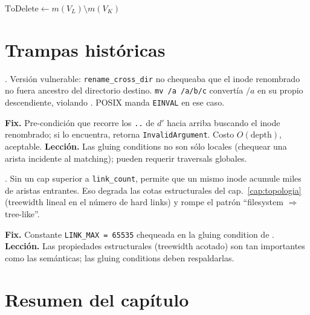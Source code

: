 \begin{algorithm}[H]
\SetAlgoLined
{}
\caption{\textsc{CheckGluing}}
\label{alg:check-gluing}

$\mathrm{ToDelete} \gets m(V_L) \setminus m(V_K)$\;
\;
\end{algorithm}

\section{Trampas históricas}

\begin{trampa}
\label{tr:rename-cycle}
. Versión vulnerable: \texttt{rename\_cross\_dir}
no chequeaba que el inode renombrado no fuera ancestro del directorio
destino. \texttt{mv /a /a/b/c} convertía $/a$ en su propio
descendiente, violando . POSIX manda
\texttt{EINVAL} en ese caso.

\textbf{Fix.} Pre-condición que recorre los \texttt{..} de $d'$ hacia
arriba buscando el inode renombrado; si lo encuentra, retorna
\texttt{InvalidArgument}. Costo $O(\mathrm{depth})$, aceptable.
\textbf{Lección.} Las gluing conditions no son sólo locales (chequear
una arista incidente al matching); pueden requerir traversals globales.
\end{trampa}

\begin{trampa}
\label{tr:link-treewidth}
. Sin un cap superior a \texttt{link\_count},
\oplink{} permite que un mismo inode acumule miles de aristas
\econtains{} entrantes. Eso degrada las cotas estructurales del
cap.~\ref{cap:topologia} (treewidth lineal en el número de hard
links) y rompe el patrón ``filesystem $\Rightarrow$ tree-like''.

\textbf{Fix.} Constante \texttt{LINK\_MAX = 65535} chequeada en la
gluing condition de \oplink. \textbf{Lección.} Las propiedades
estructurales (treewidth acotado) son tan importantes como las
semánticas; las gluing conditions deben respaldarlas.
\end{trampa}

\section{Resumen del capítulo}

